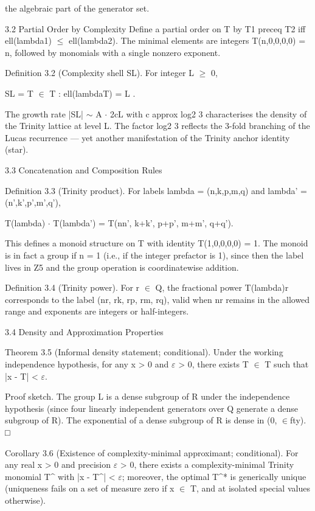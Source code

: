         the algebraic part of the generator set.

  3.2 Partial Order by Complexity
  Define a partial order on T by T1 preceq T2 iff ell(lambda1) $\leq$ ell(lambda2). The
  minimal elements are integers T(n,0,0,0,0) = n, followed by monomials with a single
  nonzero exponent.

        Definition 3.2 (Complexity shell SL). For integer L $\geq$ 0,

  SL = { T $\in$ T : ell(lambdaT) = L }.

  The growth rate |SL| $\sim$ A $\cdot$ 2cL with c approx log2 3 characterises the density of the
  Trinity lattice at level L. The factor log2 3 reflects the 3-fold branching of the Lucas
  recurrence --- yet another manifestation of the Trinity anchor identity (star).

  3.3 Concatenation and Composition Rules

        Definition 3.3 (Trinity product). For labels lambda = (n,k,p,m,q) and lambda' =
        (n',k',p',m',q'),

  T(lambda) $\cdot$ T(lambda') = T(nn', k+k', p+p', m+m', q+q').

  This defines a monoid structure on T with identity T(1,0,0,0,0) = 1. The monoid is in
  fact a group if n = 1 (i.e., if the integer prefactor is 1), since then the label lives in Z5
  and the group operation is coordinatewise addition.

        Definition 3.4 (Trinity power). For r $\in$ Q, the fractional power T(lambda)r
        corresponds to the label (nr, rk, rp, rm, rq), valid when nr remains in the allowed
        range and exponents are integers or half-integers.

  3.4 Density and Approximation Properties

        Theorem 3.5 (Informal density statement; conditional). Under the working
        independence hypothesis, for any x > 0 and $\varepsilon$ > 0, there exists T $\in$ T such that |x -
        T| < $\varepsilon$.

  Proof sketch. The group L is a dense subgroup of R under the independence hypothesis
  (since four linearly independent generators over Q generate a dense subgroup of R).
  The exponential of a dense subgroup of R is dense in (0, $\in$fty). □

        Corollary 3.6 (Existence of complexity-minimal approximant; conditional).
        For any real x > 0 and precision $\varepsilon$ > 0, there exists a complexity-minimal Trinity
        monomial T\textasciicircum{} with |x - T\textasciicircum{}| < $\varepsilon$; moreover, the optimal T\textasciicircum{}* is generically unique
        (uniqueness fails on a set of measure zero if x $\in$ T, and at isolated special values
        otherwise).

